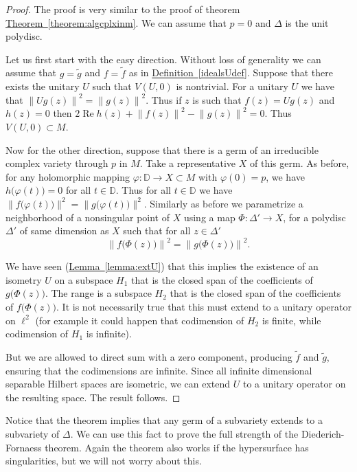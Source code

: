 \documentclass[12pt,openany]{book}
\renewcommand{\Re}{\operatorname{Re}}
\newcommand{\snorm}[1]{\lVert {#1} \rVert}
\newcommand{\norm}[1]{\left\lVert {#1} \right\rVert}
\newcommand{\bD}{{\mathbb{D}}}
\theoremstyle{plain}
\theoremstyle{remark}
\theoremstyle{definition}
\theoremstyle{exercise}
\theoremstyle{example}
\newcommand{\thmref}[1]{\hyperref[#1]{Theorem~\ref*{#1}}}
\newcommand{\lemmaref}[1]{\hyperref[#1]{Lemma~\ref*{#1}}}
\newcommand{\defnref}[1]{\hyperref[#1]{Definition~\ref*{#1}}}
\begin{document}
\begin{proof}
The proof is very similar to the proof of theorem
\thmref{theorem:algcplxinm}.
We can assume that $p=0$ and $\Delta$ is the unit polydisc.

Let us first start with the easy direction.  
Without loss of generality we can assume that $g = \tilde{g}$ and
$f = \tilde{f}$ as in \defnref{idealsUdef}.
Suppose that there
exists the unitary $U$ such that $V(U,0)$ is
nontrivial.  For a unitary $U$
we have that $\norm{Ug(z)}^2 = \norm{g(z)}^2$.  Thus if $z$
is such that $f(z) = Ug(z)$ and $h(z) = 0$ then
$2 \Re h(z) + \norm{f(z)}^2-\norm{g(z)}^2 = 0$.  Thus $V(U,0) \subset M$.

Now for the other direction, suppose that there is a germ of
an irreducible complex variety through $p$ in $M$.
Take a representative $X$ of this germ.
As before, for any
holomorphic mapping
$\varphi \colon \bD \to X \subset M$
with $\varphi(0) = p$, we have
$h\bigl(\varphi(t)\bigr) = 0$ for all $t \in \bD$.  Thus
for all $t \in \bD$ we have
$\snorm{f\bigl(\varphi(t)\bigr)}^2 = \snorm{g\bigl(\varphi(t)\bigr)}^2$.
Similarly as before we parametrize a neighborhood of a nonsingular
point of $X$ using a map $\Phi \colon \Delta' \to X$, for a polydisc
$\Delta'$ of same dimension as $X$ such that for all $z \in \Delta'$
\begin{equation}
\norm{f\bigl(\Phi(z)\bigr)}^2 = \norm{g\bigl(\Phi(z)\bigr)}^2 .
\end{equation}

We have seen (\lemmaref{lemma:extU}) that this implies the existence of
an isometry $U$
on a subspace $H_1$ that is the closed span of the coefficients of
$g\bigl(\Phi(z)\bigr)$.  The range is a subspace $H_2$ that is
the closed span of the coefficients of
$f\bigl(\Phi(z)\bigr)$.  It is not necessarily true that this must extend to
a unitary operator on $\ell^2$ (for example it could happen that codimension
of $H_2$ is finite, while codimension of $H_1$ is infinite).

But we are allowed to direct sum with a zero component, producing $\tilde{f}$
and $\tilde{g}$, ensuring that the codimensions are infinite.  Since all
infinite dimensional separable Hilbert spaces are isometric, we can extend
$U$ to a unitary operator on the resulting space.
The result follows.
\end{proof}

Notice that the theorem implies that any germ of a subvariety extends to
a subvariety of $\Delta$.  We can use this fact to prove the full strength
of the Diederich-Fornaess theorem.  Again the theorem also works if the
hypersurface has singularities, but we will not worry about this.
\end{document}
